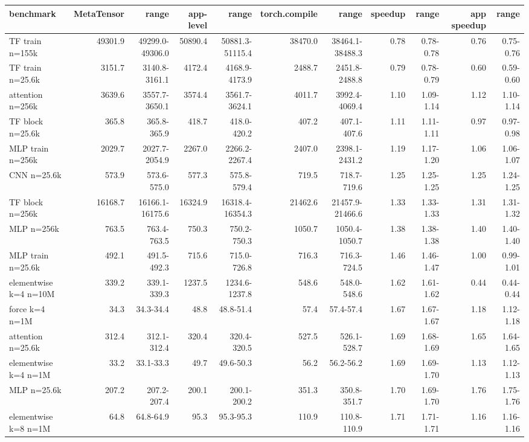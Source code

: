 \begin{tabular}{lrrrrrrrrrr}
\toprule
benchmark & MetaTensor & range & app-level & range & torch.compile & range & speedup & range & app speedup & range \\
\midrule
TF train n=155k & 49301.9 & 49299.0-49306.0 & 50890.4 & 50881.3-51115.4 & 38470.0 & 38464.1-38488.3 & 0.78 & 0.78-0.78 & 0.76 & 0.75-0.76 \\
TF train n=25.6k & 3151.7 & 3140.8-3161.1 & 4172.4 & 4168.9-4173.9 & 2488.7 & 2451.8-2488.8 & 0.79 & 0.78-0.79 & 0.60 & 0.59-0.60 \\
attention n=256k & 3639.6 & 3557.7-3650.1 & 3574.4 & 3561.7-3624.1 & 4011.7 & 3992.4-4069.4 & 1.10 & 1.09-1.14 & 1.12 & 1.10-1.14 \\
TF block n=25.6k & 365.8 & 365.8-365.9 & 418.7 & 418.0-420.2 & 407.2 & 407.1-407.6 & 1.11 & 1.11-1.11 & 0.97 & 0.97-0.98 \\
MLP train n=256k & 2029.7 & 2027.7-2054.9 & 2267.0 & 2266.2-2267.4 & 2407.0 & 2398.1-2431.2 & 1.19 & 1.17-1.20 & 1.06 & 1.06-1.07 \\
CNN n=25.6k & 573.9 & 573.6-575.0 & 577.3 & 575.8-579.4 & 719.5 & 718.7-719.6 & 1.25 & 1.25-1.25 & 1.25 & 1.24-1.25 \\
TF block n=256k & 16168.7 & 16166.1-16175.6 & 16324.9 & 16318.4-16354.3 & 21462.6 & 21457.9-21466.6 & 1.33 & 1.33-1.33 & 1.31 & 1.31-1.32 \\
MLP n=256k & 763.5 & 763.4-763.5 & 750.3 & 750.2-750.3 & 1050.7 & 1050.4-1050.7 & 1.38 & 1.38-1.38 & 1.40 & 1.40-1.40 \\
MLP train n=25.6k & 492.1 & 491.5-492.3 & 715.6 & 715.0-726.8 & 716.3 & 716.3-724.5 & 1.46 & 1.46-1.47 & 1.00 & 0.99-1.01 \\
elementwise k=4 n=10M & 339.2 & 339.1-339.3 & 1237.5 & 1234.6-1237.8 & 548.6 & 548.0-548.6 & 1.62 & 1.61-1.62 & 0.44 & 0.44-0.44 \\
force k=4 n=1M & 34.3 & 34.3-34.4 & 48.8 & 48.8-51.4 & 57.4 & 57.4-57.4 & 1.67 & 1.67-1.67 & 1.18 & 1.12-1.18 \\
attention n=25.6k & 312.4 & 312.1-312.4 & 320.4 & 320.4-320.5 & 527.5 & 526.1-528.7 & 1.69 & 1.68-1.69 & 1.65 & 1.64-1.65 \\
elementwise k=4 n=1M & 33.2 & 33.1-33.3 & 49.7 & 49.6-50.3 & 56.2 & 56.2-56.2 & 1.69 & 1.69-1.70 & 1.13 & 1.12-1.13 \\
MLP n=25.6k & 207.2 & 207.2-207.4 & 200.1 & 200.1-200.2 & 351.3 & 350.8-351.7 & 1.70 & 1.69-1.70 & 1.76 & 1.75-1.76 \\
elementwise k=8 n=1M & 64.8 & 64.8-64.9 & 95.3 & 95.3-95.3 & 110.9 & 110.8-110.9 & 1.71 & 1.71-1.71 & 1.16 & 1.16-1.16 \\

\end{tabular}
